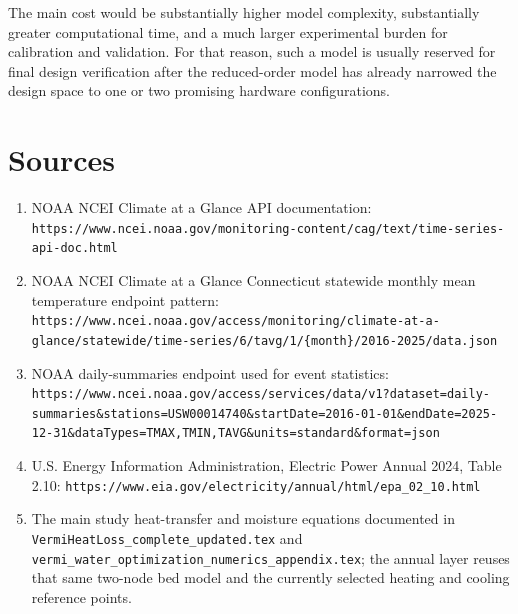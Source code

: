 \documentclass{article}
\begin{document}
The main cost would be substantially higher model complexity, substantially
greater computational time, and a much larger experimental burden for
calibration and validation. For that reason, such a model is usually reserved
for final design verification after the reduced-order model has already
narrowed the design space to one or two promising hardware configurations.

\section{Sources}

\begin{enumerate}
\item NOAA NCEI Climate at a Glance API documentation:
\texttt{https://www.ncei.noaa.gov/monitoring-content/cag/text/time-series-api-doc.html}
\item NOAA NCEI Climate at a Glance Connecticut statewide monthly mean
temperature endpoint pattern:
\texttt{https://www.ncei.noaa.gov/access/monitoring/climate-at-a-glance/statewide/time-series/6/tavg/1/\{month\}/2016-2025/data.json}
\item NOAA daily-summaries endpoint used for event statistics:
\texttt{https://www.ncei.noaa.gov/access/services/data/v1?dataset=daily-summaries\&stations=USW00014740\&startDate=2016-01-01\&endDate=2025-12-31\&dataTypes=TMAX,TMIN,TAVG\&units=standard\&format=json}
\item U.S. Energy Information Administration, Electric Power Annual 2024,
Table 2.10:
\texttt{https://www.eia.gov/electricity/annual/html/epa\_02\_10.html}
\item The main study heat-transfer and moisture equations documented in
\texttt{VermiHeatLoss\_complete\_updated.tex} and
\texttt{vermi\_water\_optimization\_numerics\_appendix.tex}; the annual layer
reuses that same two-node bed model and the currently selected heating and
cooling reference points.
\end{enumerate}
\end{document}

